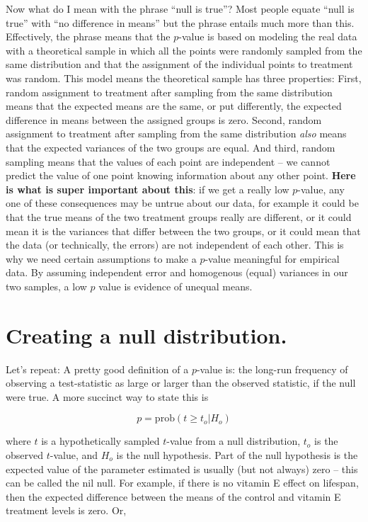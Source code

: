 \documentclass[]{book}
\theoremstyle{definition}
\theoremstyle{definition}
\theoremstyle{definition}
\theoremstyle{remark}
\begin{document}
Now what do I mean with the phrase ``null is true''? Most people equate
``null is true'' with ``no difference in means'' but the phrase entails
much more than this. Effectively, the phrase means that the \(p\)-value
is based on modeling the real data with a theoretical sample in which
all the points were randomly sampled from the same distribution and that
the assignment of the individual points to treatment was random. This
model means the theoretical sample has three properties: First, random
assignment to treatment after sampling from the same distribution means
that the expected means are the same, or put differently, the expected
difference in means between the assigned groups is zero. Second, random
assignment to treatment after sampling from the same distribution
\emph{also} means that the expected variances of the two groups are
equal. And third, random sampling means that the values of each point
are independent -- we cannot predict the value of one point knowing
information about any other point. \textbf{Here is what is super
important about this}: if we get a really low \(p\)-value, any one of
these consequences may be untrue about our data, for example it could be
that the true means of the two treatment groups really are different, or
it could mean it is the variances that differ between the two groups, or
it could mean that the data (or technically, the errors) are not
independent of each other. This is why we need certain assumptions to
make a \(p\)-value meaningful for empirical data. By assuming
independent error and homogenous (equal) variances in our two samples, a
low \(p\) value is evidence of unequal means.

\section{Creating a null
distribution.}\label{creating-a-null-distribution.}

Let's repeat: A pretty good definition of a \(p\)-value is: the long-run
frequency of observing a test-statistic as large or larger than the
observed statistic, if the null were true. A more succinct way to state
this is

\begin{equation}
p = \mathrm{prob}(t \ge t_o | H_o)
\end{equation}

where \(t\) is a hypothetically sampled \(t\)-value from a null
distribution, \(t_o\) is the observed \(t\)-value, and \(H_o\) is the
null hypothesis. Part of the null hypothesis is the expected value of
the parameter estimated is usually (but not always) zero -- this can be
called the nil null. For example, if there is no vitamin E effect on
lifespan, then the expected difference between the means of the control
and vitamin E treatment levels is zero. Or,
\end{document}
